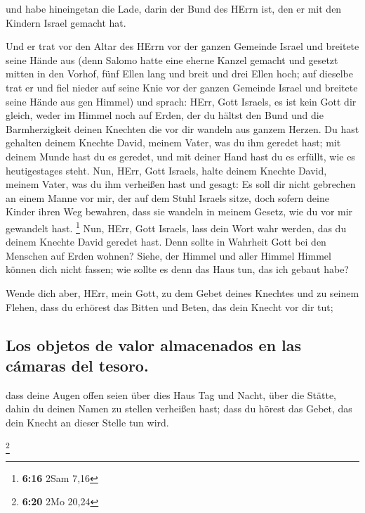  und habe hineingetan die Lade, darin der Bund des HErrn
ist, den er mit den Kindern Israel gemacht hat.

 Und er trat vor den Altar des HErrn vor der ganzen
Gemeinde Israel und breitete seine Hände aus  (denn
Salomo hatte eine eherne Kanzel gemacht und gesetzt mitten in den
Vorhof, fünf Ellen lang und breit und drei Ellen hoch; auf dieselbe trat
er und fiel nieder auf seine Knie vor der ganzen Gemeinde Israel und
breitete seine Hände aus gen Himmel)  und sprach: HErr,
Gott Israels, es ist kein Gott dir gleich, weder im Himmel noch auf
Erden, der du hältst den Bund und die Barmherzigkeit deinen Knechten die
vor dir wandeln aus ganzem Herzen.  Du hast gehalten
deinem Knechte David, meinem Vater, was du ihm geredet hast; mit deinem
Munde hast du es geredet, und mit deiner Hand hast du es erfüllt, wie es
heutigestages steht.  Nun, HErr, Gott Israels, halte
deinem Knechte David, meinem Vater, was du ihm verheißen hast und
gesagt: Es soll dir nicht gebrechen an einem Manne vor mir, der auf dem
Stuhl Israels sitze, doch sofern deine Kinder ihren Weg bewahren, dass
sie wandeln in meinem Gesetz, wie du vor mir gewandelt hast. \footnote{\textbf{6:16}
  2Sam 7,16}  Nun, HErr, Gott Israels, lass dein Wort
wahr werden, das du deinem Knechte David geredet hast. 
Denn sollte in Wahrheit Gott bei den Menschen auf Erden wohnen? Siehe,
der Himmel und aller Himmel Himmel können dich nicht fassen; wie sollte
es denn das Haus tun, das ich gebaut habe?

 Wende dich aber, HErr, mein Gott, zu dem Gebet deines
Knechtes und zu seinem Flehen, dass du erhörest das Bitten und Beten,
das dein Knecht vor dir tut;

\hypertarget{los-objetos-de-valor-almacenados-en-las-cuxe1maras-del-tesoro.}{%
\subsection{Los objetos de valor almacenados en las cámaras del
tesoro.}\label{los-objetos-de-valor-almacenados-en-las-cuxe1maras-del-tesoro.}}

 dass deine Augen offen seien über dies Haus Tag und
Nacht, über die Stätte, dahin du deinen Namen zu stellen verheißen hast;
dass du hörest das Gebet, das dein Knecht an dieser Stelle tun wird.

\footnote{\textbf{6:20} 2Mo 20,24}

